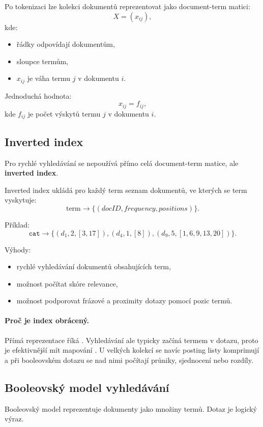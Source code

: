 Po tokenizaci lze kolekci dokumentů reprezentovat jako document-term matici:
\[
X=(x_{ij}),
\]
kde:
\begin{itemize}
    \item řádky odpovídají dokumentům,
    \item sloupce termům,
    \item $x_{ij}$ je váha termu $j$ v dokumentu $i$.
\end{itemize}

Jednoduchá hodnota:
\[
x_{ij}=f_{ij},
\]
kde $f_{ij}$ je počet výskytů termu $j$ v dokumentu $i$.

\subsection{Inverted index}

Pro rychlé vyhledávání se nepoužívá přímo celá document-term matice, ale \textbf{inverted index}.

Inverted index ukládá pro každý term seznam dokumentů, ve kterých se term vyskytuje:
\[
\text{term}
\rightarrow
\{(docID, frequency, positions)\}.
\]

Příklad:
\[
\texttt{cat}
\rightarrow
\{(d_1,2,[3,17]),(d_4,1,[8]),(d_9,5,[1,6,9,13,20])\}.
\]

Výhody:
\begin{itemize}
    \item rychlé vyhledávání dokumentů obsahujících term,
    \item možnost počítat skóre relevance,
    \item možnost podporovat frázové a proximity dotazy pomocí pozic termů.
\end{itemize}

\paragraph{Proč je index obrácený.}
Přímá reprezentace říká . Vyhledávání ale typicky začíná termem v dotazu,
proto je efektivnější mít mapování . U velkých kolekcí se navíc posting listy
komprimují a při booleovském dotazu se nad nimi počítají průniky, sjednocení nebo rozdíly.

\subsection{Booleovský model vyhledávání}

Booleovský model reprezentuje dokumenty jako množiny termů. Dotaz je logický výraz.

